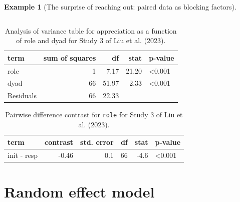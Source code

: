 \documentclass[
  11pt,
  letterpaper,
]{scrbook}
\theoremstyle{definition}
\newtheorem{example}{Example}[chapter]
\theoremstyle{definition}
\theoremstyle{remark}
\begin{document}
\begin{example}[The surprise of reaching out: paired data as blocking
factors]
\begin{longtable}[]{@{}ccccc@{}}
\end{longtable}

\begin{longtable}[]{@{}lrrrl@{}}

\caption{\label{tbl-LRMMS3-anovatab}Analysis of variance table for
appreciation as a function of role and dyad for Study 3 of Liu et al.
(2023).}

\tabularnewline

\toprule\noalign{}
term & sum of squares & df & stat & p-value \\
\midrule\noalign{}
\endhead
\bottomrule\noalign{}
\endlastfoot
role & 1 & 7.17 & 21.20 & \textless0.001 \\
dyad & 66 & 51.97 & 2.33 & \textless0.001 \\
Residuals & 66 & 22.33 & & \\

\end{longtable}

\begin{longtable}[]{@{}lrrrrl@{}}

\caption{\label{tbl-LRMMS3-emmeans}Pairwise difference contrast for
\texttt{role} for Study 3 of Liu et al. (2023).}

\tabularnewline

\toprule\noalign{}
term & contrast & std. error & df & stat & p-value \\
\midrule\noalign{}
\endhead
\bottomrule\noalign{}
\endlastfoot
init - resp & -0.46 & 0.1 & 66 & -4.6 & \textless0.001 \\

\end{longtable}

\end{example}

\section{Random effect model}\label{random-effect-model}
\end{document}
